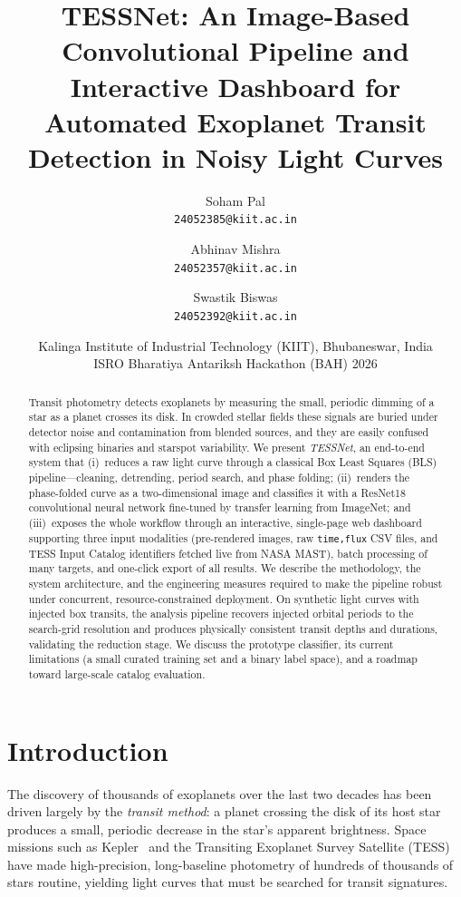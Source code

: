 \documentclass[twocolumn,10pt]{article}
\title{\textbf{TESSNet: An Image-Based Convolutional Pipeline and Interactive
Dashboard for Automated Exoplanet Transit Detection in Noisy Light Curves}}
\author{
  Soham Pal \\
  \small \texttt{24052385@kiit.ac.in}
  \and
  Abhinav Mishra \\
  \small \texttt{24052357@kiit.ac.in}
  \and
  Swastik Biswas \\
  \small \texttt{24052392@kiit.ac.in}
}
\date{
  \small Kalinga Institute of Industrial Technology (KIIT), Bhubaneswar, India \\[2pt]
  \small ISRO Bharatiya Antariksh Hackathon (BAH) 2026
}
\newcommand{\code}[1]{\texttt{\small #1}}
\begin{document}
\maketitle

\begin{abstract}
Transit photometry detects exoplanets by measuring the small, periodic dimming of
a star as a planet crosses its disk. In crowded stellar fields these signals are
buried under detector noise and contamination from blended sources, and they are
easily confused with eclipsing binaries and starspot variability. We present
\emph{TESSNet}, an end-to-end system that (i)~reduces a raw light curve through a
classical Box Least Squares (BLS) pipeline---cleaning, detrending, period search,
and phase folding; (ii)~renders the phase-folded curve as a two-dimensional image
and classifies it with a ResNet18 convolutional neural network fine-tuned by
transfer learning from ImageNet; and (iii)~exposes the whole workflow through an
interactive, single-page web dashboard supporting three input modalities
(pre-rendered images, raw \code{time,flux} CSV files, and TESS Input Catalog
identifiers fetched live from NASA MAST), batch processing of many targets, and
one-click export of all results. We describe the methodology, the system
architecture, and the engineering measures required to make the pipeline robust
under concurrent, resource-constrained deployment. On synthetic light curves with
injected box transits, the analysis pipeline recovers injected orbital periods to
the search-grid resolution and produces physically consistent transit depths and
durations, validating the reduction stage. We discuss the prototype classifier,
its current limitations (a small curated training set and a binary label space),
and a roadmap toward large-scale catalog evaluation.
\end{abstract}

\section{Introduction}
The discovery of thousands of exoplanets over the last two decades has been driven
largely by the \emph{transit method}: a planet crossing the disk of its host star
produces a small, periodic decrease in the star's apparent brightness. Space
missions such as Kepler~\cite{borucki2010} and the Transiting Exoplanet Survey
Satellite (TESS)~\cite{ricker2015} have made high-precision, long-baseline
photometry of hundreds of thousands of stars routine, yielding light curves that
must be searched for transit signatures.
\end{document}
